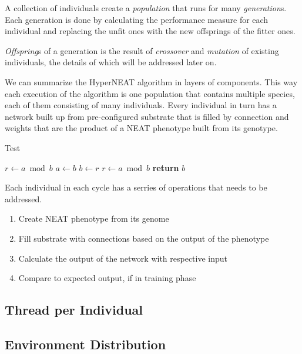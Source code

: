 \documentclass[twocolumn]{article}
\begin{document}
A collection of individuals create a \textit{population} that runs for many \textit{generation}s. Each generation is done by calculating the performance measure for each individual and replacing the unfit ones with the new offsprings of the fitter ones.

\textit{Offspring}s of a generation is the result of \textit{crossover} and \textit{mutation} of existing individuals, the details of which will be addressed later on.

We can summarize the HyperNEAT algorithm in layers of components. This way each execution of the algorithm is one population that contains multiple species, each of them consisting of many individuals. Every individual in turn has a network built up from pre-configured substrate that is filled by connection and weights that are the product of a NEAT phenotype built from its genotype.

\begin{algorithm}
    \caption{Test}
    \label{test}
    \begin{algorithmic}[1]
         
            \State $r\gets a \bmod b$
             
                \State $a \gets b$
                \State $b \gets r$
                \State $r \gets a \bmod b$
            \EndWhile\label{euclidendwhile}
            \State \textbf{return} $b$
        \EndProcedure
    \end{algorithmic}
\end{algorithm}

Each individual in each cycle has a serries of operations that needs to be addressed.

\begin{enumerate}
    \item Create NEAT phenotype from its genome
    \item Fill substrate with connections based on the output of the phenotype
    \item Calculate the output of the network with respective input
    \item Compare to expected output, if in training phase
\end{enumerate}

\subsection{Thread per Individual}
\subsection{Environment Distribution}
\end{document}
